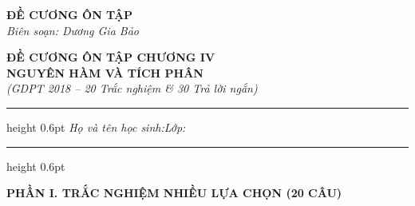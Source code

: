 \documentclass[12pt,a4paper]{article}
\begin{document}
\thispagestyle{firstpage}

\noindent
\begin{minipage}[t]{0.36\textwidth}
    \centering
    {\fontsize{12}{14}\selectfont\textbf{ĐỀ CƯƠNG ÔN TẬP}}\\[4pt]
    \textit{Biên soạn: Dương Gia Bảo}\\[6pt]
    \setlength{\fboxrule}{0.8pt}
    \setlength{\fboxsep}{5pt}
\end{minipage}\hfill
\begin{minipage}[t]{0.62\textwidth}
    \centering
    {\fontsize{13}{15}\selectfont\textbf{ĐỀ CƯƠNG ÔN TẬP CHƯƠNG IV}}\\[3pt]
    {\fontsize{12}{14}\selectfont\textbf{NGUYÊN HÀM VÀ TÍCH PHÂN}}\\[3pt]
    {\fontsize{11}{13}\selectfont\textit{(GDPT 2018 -- 20 Trắc nghiệm \& 30 Trả lời ngắn)}}
\end{minipage}

\par\vspace{4pt}
\hrule height 0.6pt
\vspace{4pt}
\noindent\textit{Họ và tên học sinh:}\dotfill\hspace{0.8cm}\textit{Lớp:}\makebox[3.2cm]{\dotfill}
\par\vspace{3pt}
\hrule height 0.6pt
\vspace{6pt}

\begin{center}
    {\fontsize{13}{15}\selectfont\textbf{PHẦN I. TRẮC NGHIỆM NHIỀU LỰA CHỌN (20 CÂU)}}
\end{center}
\end{document}
